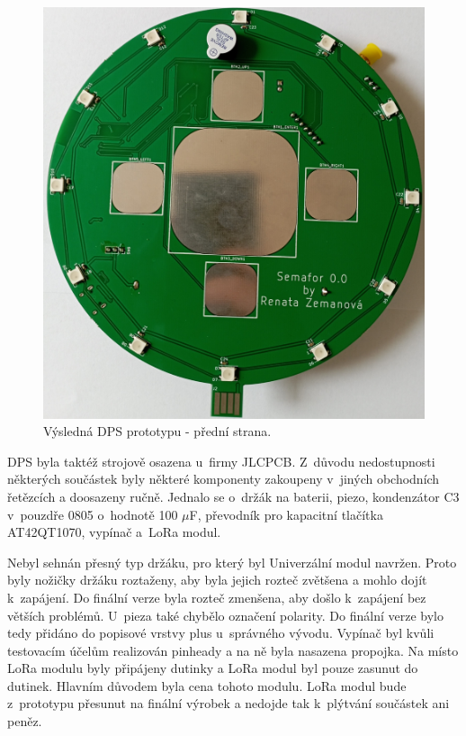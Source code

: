 \begin{figure}[!h]
  \begin{center}
    \includegraphics[scale=0.15]{obrazky/DPS_prototyp_top.jpg}
  \end{center}
  \caption[Výsledná DPS prototypu - přední strana]{Výsledná DPS prototypu - přední strana.}
\end{figure}

DPS byla taktéž strojově osazena u~firmy JLCPCB. Z~důvodu nedostupnosti některých součástek byly některé komponenty zakoupeny v~jiných obchodních řetězcích a doosazeny ručně. 
Jednalo se o~držák na baterii, piezo, kondenzátor C3 v~pouzdře 0805 o~hodnotě 100 $\mu$F, převodník pro kapacitní tlačítka AT42QT1070, vypínač a~LoRa modul. 

Nebyl sehnán přesný typ držáku, pro který byl Univerzální modul navržen. Proto byly nožičky držáku roztaženy, aby byla jejich rozteč zvětšena a mohlo dojít k~zapájení. Do finální 
verze byla rozteč zmenšena, aby došlo k~zapájení bez větších problémů. U~pieza také chybělo 
označení polarity. Do finální verze bylo tedy přidáno do popisové vrstvy plus u~správného vývodu. Vypínač byl kvůli testovacím účelům realizován pinheady a na ně byla nasazena 
propojka. Na místo LoRa modulu byly připájeny dutinky a LoRa modul byl pouze zasunut do dutinek. Hlavním důvodem byla cena tohoto modulu. LoRa modul bude z~prototypu přesunut 
na finální výrobek a nedojde tak k~plýtvání součástek ani peněz.

